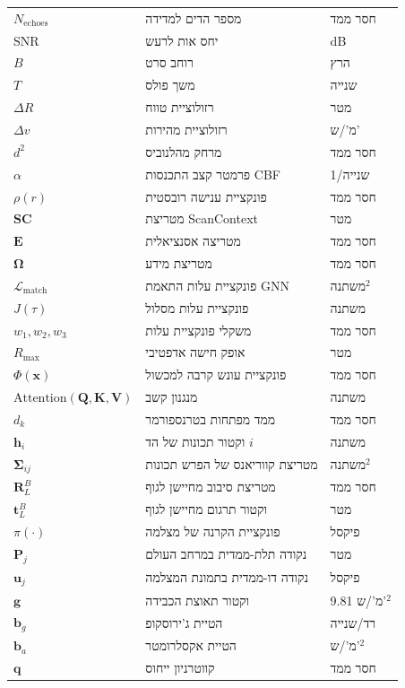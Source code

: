 \begin{table}[htbp]
{\begin{tabular}{@{}lll@{} }
$N_{\text{echoes}}$ & מספר הדים למדידה & חסר ממד \\
$\text{SNR}$ & יחס אות לרעש & dB \\
$B$ & רוחב סרט & הרץ \\
$T$ & משך פולס & שנייה \\
$\Delta R$ & רזולוציית טווח & מטר \\
$\Delta v$ & רזולוציית מהירות & מ'/ש' \\
$d^2$ & מרחק מהלנוביס & חסר ממד \\
$\alpha$ & פרמטר קצב התכנסות CBF & 1/שנייה \\
$\rho(r)$ & פונקציית ענישה רובסטית & חסר ממד \\
$\mathbf{SC}$ & מטריצת ScanContext & מטר \\
$\mathbf{E}$ & מטריצה אסנציאלית & חסר ממד \\
$\mathbf{\Omega}$ & מטריצת מידע & חסר ממד \\
$\mathcal{L}_{\text{match}}$ & פונקציית עלות התאמת GNN & משתנה$^2$ \\
$J(\tau)$ & פונקציית עלות מסלול & משתנה \\
$w_1, w_2, w_3$ & משקלי פונקציית עלות & חסר ממד \\
$R_{\text{max}}$ & אופק חישה אדפטיבי & מטר \\
$\Phi(\mathbf{x})$ & פונקציית עונש קרבה למכשול & חסר ממד \\
$\text{Attention}(\mathbf{Q}, \mathbf{K}, \mathbf{V})$ & מנגנון קשב & משתנה \\
$d_k$ & ממד מפתחות בטרנספורמר & חסר ממד \\
$\mathbf{h}_i$ & וקטור תכונות של הד $i$ & משתנה \\
$\mathbf{\Sigma}_{ij}$ & מטריצת קווריאנס של הפרש תכונות & משתנה$^2$ \\
$\mathbf{R}_{L}^{B}$ & מטריצת סיבוב מחיישן לגוף & חסר ממד \\
$\mathbf{t}_{L}^{B}$ & וקטור תרגום מחיישן לגוף & מטר \\
$\pi(\cdot)$ & פונקציית הקרנה של מצלמה & פיקסל \\
$\mathbf{P}_j$ & נקודה תלת-ממדית במרחב העולם & מטר \\
$\mathbf{u}_j$ & נקודה דו-ממדית בתמונת המצלמה & פיקסל \\
$\mathbf{g}$ & וקטור תאוצת הכבידה & 9.81 מ'/ש'$^2$ \\
$\mathbf{b}_g$ & הטיית ג'ירוסקופ & רד/שנייה \\
$\mathbf{b}_a$ & הטיית אקסלרומטר & מ'/ש'$^2$ \\
$\mathbf{q}$ & קווטרניון ייחוס & חסר ממד \\
\bottomrule
\end{tabular}%
}
\end{table}

